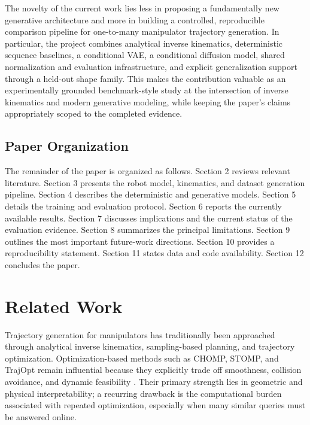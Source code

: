 \documentclass[11pt]{article}
\begin{document}
The novelty of the current work lies less in proposing a fundamentally new generative architecture and more in building a controlled, reproducible comparison pipeline for one-to-many manipulator trajectory generation. In particular, the project combines analytical inverse kinematics, deterministic sequence baselines, a conditional VAE, a conditional diffusion model, shared normalization and evaluation infrastructure, and explicit generalization support through a held-out shape family. This makes the contribution valuable as an experimentally grounded benchmark-style study at the intersection of inverse kinematics and modern generative modeling, while keeping the paper's claims appropriately scoped to the completed evidence.

\subsection*{Paper Organization}

The remainder of the paper is organized as follows. Section 2 reviews relevant literature. Section 3 presents the robot model, kinematics, and dataset generation pipeline. Section 4 describes the deterministic and generative models. Section 5 details the training and evaluation protocol. Section 6 reports the currently available results. Section 7 discusses implications and the current status of the evaluation evidence. Section 8 summarizes the principal limitations. Section 9 outlines the most important future-work directions. Section 10 provides a reproducibility statement. Section 11 states data and code availability. Section 12 concludes the paper.

\section{Related Work}

Trajectory generation for manipulators has traditionally been approached through analytical inverse kinematics, sampling-based planning, and trajectory optimization. Optimization-based methods such as CHOMP, STOMP, and TrajOpt remain influential because they explicitly trade off smoothness, collision avoidance, and dynamic feasibility \cite{ratliff2009chomp, kalakrishnan2011stomp, schulman2013trajopt}. Their primary strength lies in geometric and physical interpretability; a recurring drawback is the computational burden associated with repeated optimization, especially when many similar queries must be answered online.
\end{document}
